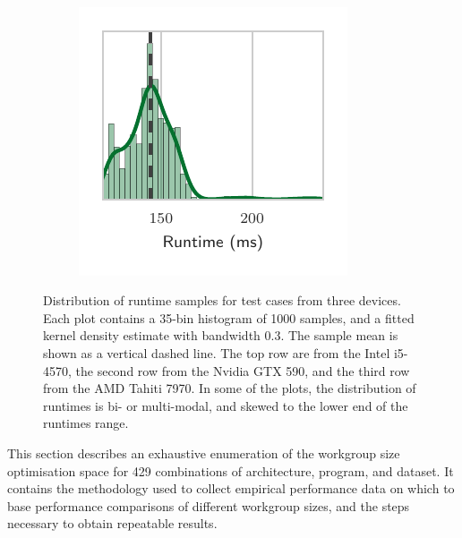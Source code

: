 \documentclass[nonatbib,preprint,9pt]{sigplanconf}
\begin{document}
\begin{figure}
\begin{subfigure}[h]{.32\columnwidth}
\vspace{-1.5em} %
\caption{}
\label{fig:runtimes-histogram-8}
\end{subfigure}
~%
\begin{subfigure}[h]{.32\columnwidth}
\centering
\includegraphics[width=\textwidth]{img/runtimes_histogram_9}
\vspace{-1.5em} %
\caption{}
\label{fig:runtimes-histogram-9}
\end{subfigure}
\caption[Distribution of stencil code runtimes]{%
  Distribution of runtime samples for test cases from three
  devices. Each plot contains a 35-bin histogram of 1000 samples, and
  a fitted kernel density estimate with bandwidth 0.3. The sample mean
  is shown as a vertical dashed line. The top row are from the Intel
  i5-4570, the second row from the Nvidia GTX 590, and the third row
  from the AMD Tahiti 7970. In some of the plots, the distribution of
  runtimes is bi- or multi-modal, and skewed to the lower end of the
  runtimes range.%
}
\label{fig:runtime-histograms}
\end{figure}

This section describes an exhaustive enumeration of the workgroup size
optimisation space for 429 combinations of architecture, program, and
dataset. It contains the methodology used to collect empirical
performance data on which to base performance comparisons of different
workgroup sizes, and the steps necessary to obtain repeatable results.
\end{document}
